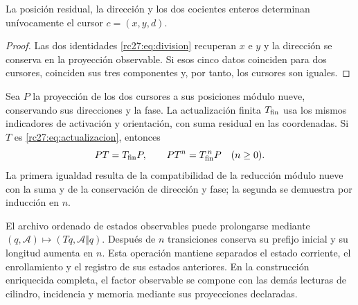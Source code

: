 \begin{proposition}
La posición residual, la dirección y los dos cocientes enteros
determinan unívocamente el cursor $c=(x,y,d)$.
\end{proposition}
\begin{proof}
Las dos identidades \eqref{rc27:eq:division} recuperan $x$ e $y$
y la dirección se conserva en la proyección observable. Si esos
cinco datos coinciden para dos cursores, coinciden sus tres
componentes y, por tanto, los cursores son iguales.
\end{proof}

Sea $P$ la proyección de los dos cursores a sus posiciones módulo
nueve, conservando sus direcciones y la fase. La actualización
finita $T_{\rm fin}$ usa los mismos indicadores de activación y
orientación, con suma residual en las coordenadas. Si $T$ es
\eqref{rc27:eq:actualizacion}, entonces
\[
PT=T_{\rm fin}P,\qquad PT^n=T_{\rm fin}^{\,n}P
\quad(n\ge0).
\]
La primera igualdad resulta de la compatibilidad de la reducción
módulo nueve con la suma y de la conservación de dirección y fase;
la segunda se demuestra por inducción en $n$.

El archivo ordenado de estados observables puede prolongarse mediante
$(q,\mathcal A)\mapsto(Tq,\mathcal A\Vert q)$.
Después de $n$ transiciones conserva su prefijo inicial y su longitud
aumenta en $n$. Esta operación mantiene separados el estado corriente,
el enrollamiento y el registro de sus estados anteriores. En la
construcción enriquecida completa, el factor observable se compone
con las demás lecturas de cilindro, incidencia y memoria mediante sus
proyecciones declaradas.
